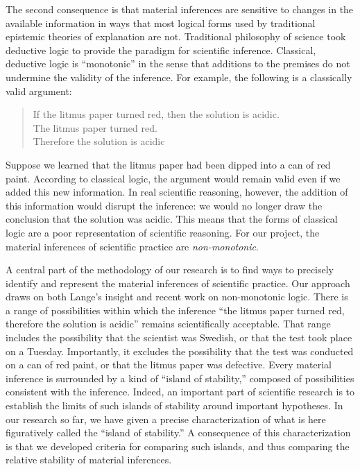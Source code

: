 \documentclass{article}[11pt]
\begin{document}
The second consequence is that material inferences are sensitive to changes in the available  information in ways that most logical forms used by traditional epistemic theories of explanation are not.  Traditional philosophy of science took deductive logic to provide the paradigm for scientific inference.  Classical, deductive logic is ``monotonic'' in the  sense that additions to the premises do not undermine the validity of the inference.  For example, the following is a classically valid argument:

\begin{quote}
	If the litmus paper turned red, then the solution is acidic. \\[-6pt]
	The litmus paper turned red. \\[-6pt]
	Therefore the solution is acidic
\end{quote}

\noindent Suppose we learned that the litmus paper had been dipped into a can of red paint.  According to classical logic, the argument would remain valid even if we added this new information.  In real scientific reasoning, however, the addition of this information would disrupt the inference: we would no longer draw the conclusion that the solution was acidic.  This means that the forms of classical logic are a poor representation of scientific reasoning.  For our project, the material inferences of scientific practice are \textit{non-monotonic}.

A central part of the methodology of our research is to find ways to precisely identify and represent the material inferences of scientific practice.  Our approach draws on both Lange's insight and recent work on non-monotonic logic.   There is a range of possibilities within which the inference ``the litmus paper turned red, therefore the solution is acidic''  remains scientifically acceptable.  That range includes the possibility that the scientist was Swedish, or that the test took place on a Tuesday.  Importantly, it excludes the possibility that the test was conducted on a can of red paint, or that the litmus paper was defective.  Every material inference is surrounded by a kind of ``island of stability,'' composed of possibilities consistent with the inference. Indeed, an important part of scientific research is to establish the limits of such islands of stability around important hypotheses.  In our research so far, we have given a precise characterization of what is here figuratively called the ``island of stability.''   A consequence of this characterization is that we developed criteria for comparing such islands, and thus comparing the relative stability of material inferences. 
\end{document}

